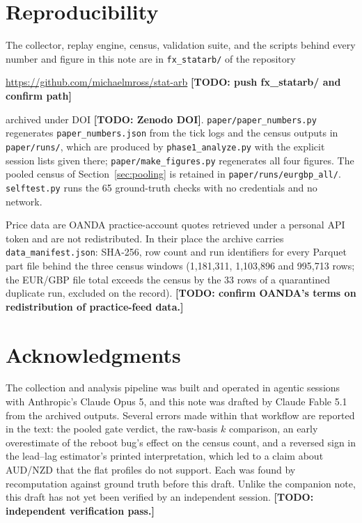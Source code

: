\documentclass[11pt]{article}
\begin{document}
\section*{Reproducibility}

The collector, replay engine, census, validation suite, and the
scripts behind every number and figure in this note are in
\texttt{fx\_statarb/} of the repository

\begin{center}
\url{https://github.com/michaelmross/stat-arb}\quad
\textbf{[TODO: push fx\_statarb/ and confirm path]}
\end{center}

\noindent archived under DOI \textbf{[TODO: Zenodo DOI]}.
\texttt{paper/paper\_numbers.py} regenerates \texttt{paper\_numbers.json}
from the tick logs and the census outputs in \texttt{paper/runs/},
which are produced by \texttt{phase1\_analyze.py} with the explicit
session lists given there; \texttt{paper/make\_figures.py} regenerates
all four figures. The pooled census of Section~\ref{sec:pooling} is
retained in \texttt{paper/runs/eurgbp\_all/}. \texttt{selftest.py}
runs the 65 ground-truth checks with no credentials and no network.

Price data are OANDA practice-account quotes retrieved under a personal
API token and are not redistributed. In their place the archive
carries \texttt{data\_manifest.json}: SHA-256, row count and run
identifiers for every Parquet part file behind the three census
windows (1{,}181{,}311, 1{,}103{,}896 and 995{,}713 rows; the EUR/GBP
file total exceeds the census by the 33 rows of a quarantined
duplicate run, excluded on the record). \textbf{[TODO: confirm OANDA's
terms on redistribution of practice-feed data.]}

\section*{Acknowledgments}

The collection and analysis pipeline was built and operated in agentic
sessions with Anthropic's Claude Opus 5, and this note was drafted by
Claude Fable 5.1 from the archived outputs. Several errors made within
that workflow are reported in the text: the pooled gate verdict, the
raw-basis $k$ comparison, an early overestimate of the reboot bug's
effect on the census count, and a reversed sign in the lead--lag
estimator's printed interpretation, which led to a claim about AUD/NZD
that the flat profiles do not support. Each was found by recomputation
against ground truth before this draft. Unlike the companion note, this
draft has not yet been verified by an independent session.
\textbf{[TODO: independent verification pass.]}
\end{document}
